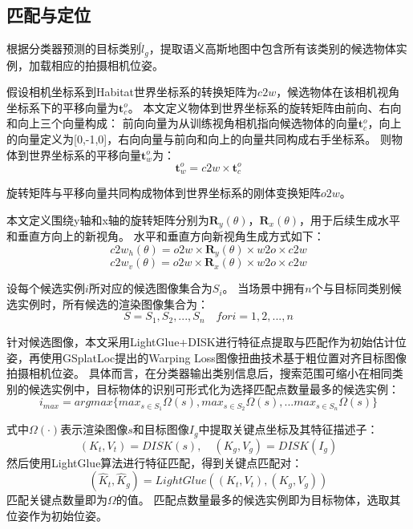 \subsection{匹配与定位}
根据分类器预测的目标类别$\hat{l}_g$，提取语义高斯地图中包含所有该类别的候选物体实例，加载相应的拍摄相机位姿。

假设相机坐标系到Habitat世界坐标系的转换矩阵为$c2w$，候选物体在该相机视角坐标系下的平移向量为$\boldsymbol{t}_c^{o}$。
本文定义物体到世界坐标系的旋转矩阵由前向、右向和向上三个向量构成：
前向向量为从训练视角相机指向候选物体的向量$\boldsymbol{t}_c^{o}$，向上的向量定义为[0,-1,0]，右向向量与前向和向上的向量共同构成右手坐标系。
则物体到世界坐标系的平移向量$\boldsymbol{t}_w^{o}$为：
\begin{equation}
    \boldsymbol{t}_w^{o}={c2w} \times \boldsymbol{t}_c^{o}
\end{equation}

旋转矩阵与平移向量共同构成物体到世界坐标系的刚体变换矩阵$o2w$。

本文定义围绕y轴和x轴的旋转矩阵分别为$\boldsymbol{R}_{y}(\theta)$，$\boldsymbol{R}_{x}(\theta)$，用于后续生成水平和垂直方向上的新视角。
水平和垂直方向新视角生成方式如下：
\begin{equation}
    c2w_{h}(\theta)=o2w\times \boldsymbol{R}_{y}(\theta)\times w2o\times c2w
\end{equation}
\begin{equation}
    c2w_{v}(\theta)=o2w\times \boldsymbol{R}_{x}(\theta)\times w2o\times c2w
\end{equation}

设每个候选实例$i$所对应的候选图像集合为$S_{i}$。
当场景中拥有$n$个与目标同类别候选实例时，所有候选的渲染图像集合为：
\begin{equation}
    S={S_1,S_2,...,S_n} \quad for i=1,2,...,n
\end{equation}

针对候选图像，本文采用LightGlue+DISK\cite{disk,lightglue}进行特征点提取与匹配作为初始估计位姿，再使用GSplatLoc\cite{gsplatloc}提出的Warping Loss图像扭曲技术基于粗位置对齐目标图像拍摄相机位姿。
具体而言，在分类器输出类别信息后，搜索范围可缩小在相同类别的候选实例中，目标物体的识别可形式化为选择匹配点数量最多的候选实例：
\begin{equation}
    i_{max}=argmax\{max_{s\in S_{1}}\Omega (s),max_{s\in S_{2}}\Omega (s),...max_{s\in S_{n}}\Omega (s)\}
\end{equation}

式中$\Omega (\cdot)$表示渲染图像$s$和目标图像$I_g$中提取关键点坐标及其特征描述子：
\begin{equation}
    (K_t,V_t)=DISK(s), \quad (K_g,V_g)=DISK(I_g)
\end{equation}
然后使用LightGlue算法进行特征匹配，得到关键点匹配对：
\begin{equation}
    (\hat{K}_t,\hat{K}_g)=LightGlue((K_t,V_t),(K_g,V_g))
\end{equation}
匹配关键点数量即为$\Omega$的值。
匹配点数量最多的候选实例即为目标物体，选取其位姿作为初始位姿。

